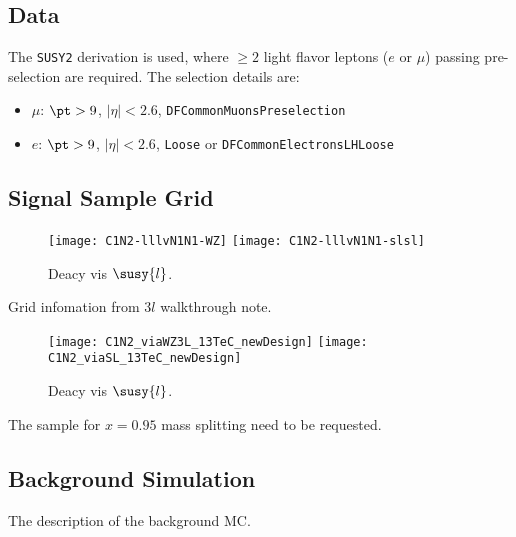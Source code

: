 \subsection{Data}
The \verb+SUSY2+ derivation is used, where $\geq2$ light flavor leptons ($e$ or $\mu$) passing pre-selection are required. The selection details are:
\begin{itemize}
  \item $\mu$: $\pt>9$, $|\eta|<2.6$, \verb+DFCommonMuonsPreselection+
  \item $e$: $\pt>9$, $|\eta|<2.6$, \verb+Loose+ or \verb+DFCommonElectronsLHLoose+
\end{itemize}

\subsection{Signal Sample Grid}
\begin{figure}
  \centering
  \texttt{[image: C1N2-lllvN1N1-WZ]}
  \texttt{[image: C1N2-lllvN1N1-slsl]}
  \caption{Deacy vis $\susy{l}$.}
  \label{fig_grid_sl}
\end{figure}
Grid infomation from $3l$ walkthrough note.
\begin{figure}
  \centering
  \texttt{[image: C1N2\_viaWZ3L\_13TeC\_newDesign]}
  \texttt{[image: C1N2\_viaSL\_13TeC\_newDesign]}
  \caption{Deacy vis $\susy{l}$.}
  \label{fig_grid_sl}
\end{figure}


The sample for $x=0.95$ mass splitting need to be requested.

\subsection{Background Simulation}
The description of the background MC.

